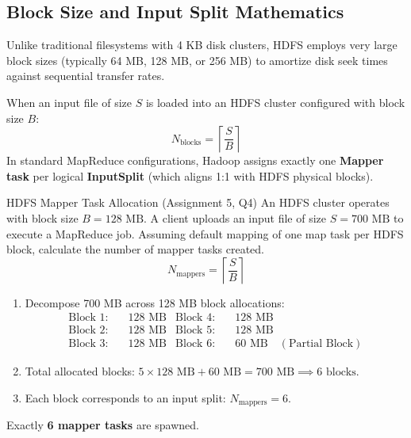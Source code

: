 \subsection{Block Size and Input Split Mathematics}
Unlike traditional filesystems with 4 KB disk clusters, HDFS employs very large block sizes (typically 64 MB, 128 MB, or 256 MB) to amortize disk seek times against sequential transfer rates.

When an input file of size $S$ is loaded into an HDFS cluster configured with block size $B$:
\begin{equation}
N_{\text{blocks}} = \left\lceil \frac{S}{B} \right\rceil
\end{equation}
In standard MapReduce configurations, Hadoop assigns exactly one \textbf{Mapper task} per logical \textbf{InputSplit} (which aligns 1:1 with HDFS physical blocks).

\begin{solved}{HDFS Mapper Task Allocation (Assignment 5, Q4)}
\Given An HDFS cluster operates with block size $B = 128\text{ MB}$. A client uploads an input file of size $S = 700\text{ MB}$ to execute a MapReduce job. Assuming default mapping of one map task per HDFS block, calculate the number of mapper tasks created.
\Formula
\begin{equation}
N_{\text{mappers}} = \left\lceil \frac{S}{B} \right\rceil
\end{equation}
\Steps
\begin{enumerate}[leftmargin=*]
  \item Decompose 700 MB across 128 MB block allocations:
  \begin{align*}
  \text{Block 1:} & \quad 128\text{ MB} & \text{Block 4:} & \quad 128\text{ MB}\\
  \text{Block 2:} & \quad 128\text{ MB} & \text{Block 5:} & \quad 128\text{ MB}\\
  \text{Block 3:} & \quad 128\text{ MB} & \text{Block 6:} & \quad 60\text{ MB} \quad (\text{Partial Block})
  \end{align*}
  \item Total allocated blocks: $5 \times 128\text{ MB} + 60\text{ MB} = 700\text{ MB} \implies 6\text{ blocks}$.
  \item Each block corresponds to an input split: $N_{\text{mappers}} = 6$.
\end{enumerate}
\Answer Exactly \textbf{6 mapper tasks} are spawned.
\end{solved}

